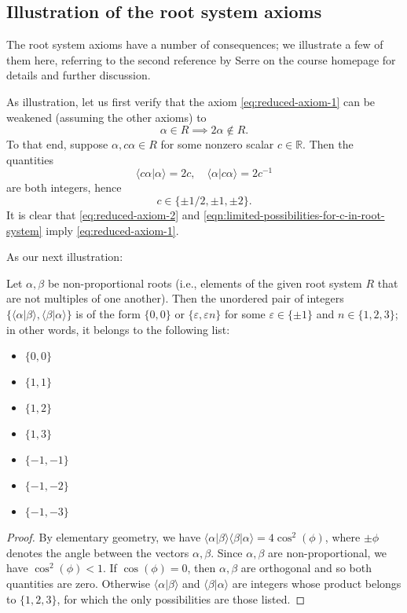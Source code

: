 \documentclass[reqno]{amsart} 
\def\eps{\varepsilon}
\begin{document}
\subsection{Illustration of the root system axioms}
\label{sec:org44a29a8}
The root system axioms have a number of consequences; we illustrate a few of them here, referring to the second reference by Serre on the course homepage for details and further discussion.

As illustration, let us first verify that the axiom \eqref{eq:reduced-axiom-1} can be weakened (assuming the other axioms) to
\begin{equation}\label{eq:reduced-axiom-2}
  \alpha \in R \implies 2 \alpha \notin R.
\end{equation}
To that end, suppose $\alpha, c \alpha \in R$ for some nonzero scalar $c \in \mathbb{R}$.  Then the quantities
\begin{equation*}
  \langle c \alpha | \alpha \rangle = 2 c, \quad \langle \alpha | c \alpha \rangle = 2 c^{-1}
\end{equation*}
are both integers, hence
\begin{equation}\label{eqn:limited-possibilities-for-c-in-root-system}
  c \in \{\pm 1/2, \pm 1, \pm 2\}.
\end{equation}
It is clear that \eqref{eq:reduced-axiom-2} and \eqref{eqn:limited-possibilities-for-c-in-root-system} imply \eqref{eq:reduced-axiom-1}.

As our next illustration:
\begin{lemma}
  \label{lem:possibilities-for-inner-products-roots}
  Let $\alpha,\beta$ be non-proportional roots (i.e., elements of the given root system $R$ that are not multiples of one another).  Then the unordered pair of integers $\{\langle \alpha|\beta \rangle, \langle \beta|\alpha \rangle\}$ is of the form $\{0,0\}$ or $\{\eps, \eps n\}$ for some $\eps \in \{\pm 1\}$ and $n \in \{1,2,3\}$; in other words, it belongs to the following list:
  \begin{itemize}
  \item $\{0,0\}$
  \item $\{1,1\}$
  \item $\{1,2\}$
  \item $\{1,3\}$
  \item $\{-1,-1\}$
  \item $\{-1,-2\}$
  \item $\{-1,-3\}$
  \end{itemize}
\end{lemma}
\begin{proof}
  By elementary geometry, we have $\langle \alpha |\beta \rangle \langle \beta | \alpha \rangle = 4 \cos^2(\phi)$, where $\pm \phi$ denotes the angle between the vectors $\alpha,\beta$.  Since $\alpha,\beta$ are non-proportional, we have $\cos^2(\phi) < 1$.  If $\cos(\phi) = 0$, then $\alpha,\beta$ are orthogonal and so both quantities are zero.  Otherwise $\langle \alpha|\beta \rangle$ and $\langle \beta|\alpha \rangle$ are integers whose product belongs to $\{1,2,3\}$, for which the only possibilities are those listed.
\end{proof}
\end{document}
